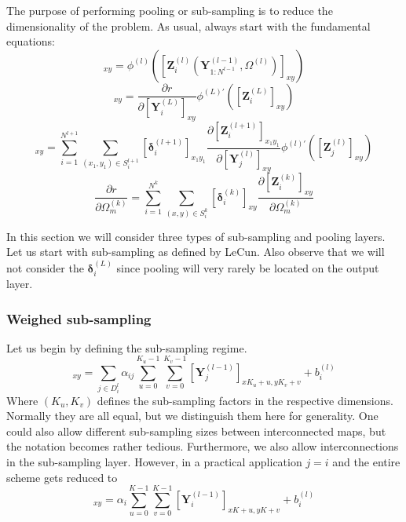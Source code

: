 \documentclass[a4paper,10pt]{article}
\theoremstyle{definition}
\begin{document}
The purpose of performing pooling or sub-sampling is to reduce the dimensionality of the problem.
As usual, always start with the fundamental equations:
\begin{equation}
	[\pmb{Y}_i^{(l)}]_{xy} = \phi^{(l)}([\pmb{Z}^{(l)}_{i}(\pmb{Y}^{(l-1)}_{1:N^{l-1}}, \Omega^{(l)})]_{xy})
\end{equation}
\begin{equation}
	[\pmb{\delta}_i^{(L)}]_{xy} = \frac{\partial r}{\partial [\pmb{Y}^{(L)}_i]_{xy}}\phi^{(L)'}([\pmb{Z}^{(L)}_{i}]_{xy})
\end{equation}
\begin{equation}
	[\pmb{\delta}_j^{(l)}]_{xy} = \sum_{i = 1}^{N^{l+1}}\sum_{(x_1,y_1) \in S^{l+1}_i} [\pmb{\delta}^{(l+1)}_i]_{x_1y_1} \frac{\partial [\pmb{Z}^{(l + 1)}_{i}]_{x_1y_1}}{\partial [\pmb{Y}^{(l)}_j]_{xy}} \phi^{(l)'}([\pmb{Z}^{(l)}_{j}]_{xy})
\end{equation}
\begin{equation}
	\frac{\partial r}{\partial \Omega^{(k)}_m} = \sum_{i = 1}^{N^{k}}\sum_{(x,y) \in S^{k}_i} [\pmb{\delta}_i^{(k)}]_{xy} \frac{\partial [\pmb{Z}^{(k)}_i]_{xy}}{\partial \Omega^{(k)}_m}
\end{equation}

In this section we will consider three types of sub-sampling and pooling layers. Let us start with sub-sampling as defined by LeCun. Also observe that we will not consider the $\pmb{\delta}_i^{(L)}$ since pooling will very rarely be located on the output layer.
\subsubsection{Weighed sub-sampling}
Let us begin by defining the sub-sampling regime.
\begin{equation}
[\pmb{Z}^{(l)}_{i}(\pmb{Y}^{(l-1)}_{1:N^{l-1}}, \Omega^{(l)})]_{xy} = \sum_{j \in D^l_i} \alpha_{ij} \sum_{u = 0}^{K_u - 1}\sum_{v = 0}^{K_v - 1} [\pmb{Y}^{(l-1)}_j]_{xK_u + u, yK_v + v} + b_i^{(l)}
\end{equation}
Where $(K_u, K_v)$ defines the sub-sampling factors in the respective dimensions. Normally they are all equal, but we distinguish them here for generality. One could also allow different sub-sampling sizes between interconnected maps, but the notation becomes rather tedious. Furthermore, we also allow interconnections in the sub-sampling layer. However, in a practical application $j = i$ and the entire scheme gets reduced to
\begin{equation}
[\pmb{Z}^{(l)}_{i}(\pmb{Y}^{(l-1)}_{1:N^{l-1}}, \Omega^{(l)})]_{xy} =  \alpha_{i} \sum_{u = 0}^{K - 1}\sum_{v = 0}^{K - 1} [\pmb{Y}^{(l-1)}_i]_{xK + u, yK + v} + b_i^{(l)}
\end{equation}
\end{document}
